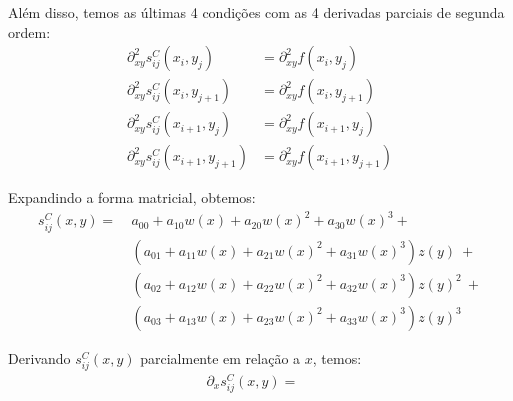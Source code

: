 \documentclass[a4paper, 12pt]{article}
\begin{document}
Além disso, temos as últimas 4 condições com as 4 derivadas parciais de segunda
ordem:
\begin{align}
    \partial_{xy}^{2}s_{ij}^C(x_{i}, y_{j})      &= \partial_{xy}^{2}f(x_{i}, y_{j}) \tag{13}      \\
    \partial_{xy}^{2}s_{ij}^C(x_{i}, y_{j+1})    &= \partial_{xy}^{2}f(x_{i}, y_{j+1}) \tag{14}    \\
    \partial_{xy}^{2}s_{ij}^C(x_{i+1}, y_{j})    &= \partial_{xy}^{2}f(x_{i+1}, y_{j}) \tag{15}    \\
    \partial_{xy}^{2}s_{ij}^C(x_{i+1}, y_{j+1})  &= \partial_{xy}^{2}f(x_{i+1}, y_{j+1}) \tag{16}
\end{align}

Expandindo a forma matricial, obtemos:
\begin{align*}
    s_{ij}^C(x,y) =\ &a_{00} + a_{10}w{(x)} + a_{20}w{(x)}^{2} + a_{30}w{(x)}^{3} +          \\ 
               &{(a_{01} + a_{11}w{(x)} + a_{21}w{(x)}^{2} + a_{31}w{(x)}^{3})}z{(y)}\ +     \\ 
               &{(a_{02} + a_{12}w{(x)} + a_{22}w{(x)}^{2} + a_{32}w{(x)}^{3})}z{(y)}^{2}\ + \\
               &{(a_{03} + a_{13}w{(x)} + a_{23}w{(x)}^{2} + a_{33}w{(x)}^{3})}z{(y)}^{3}
\end{align*}

Derivando $s_{ij}^C(x,y)$ parcialmente em relação a $x$, temos:
\begin{align*}
    \partial_{x}s_{ij}^C(x, y) =\ &
\end{align*}
\end{document}
